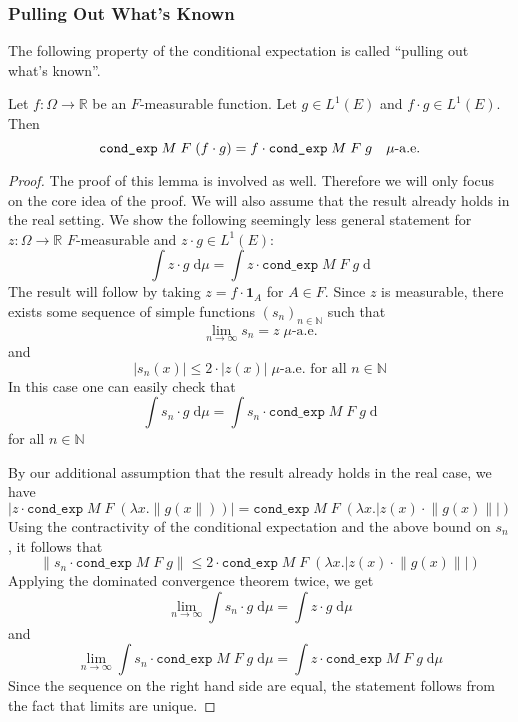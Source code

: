 \subsubsection{Pulling Out What's Known}

The following property of the conditional expectation is called ``pulling out what's known''. 

\begin{lemma}
	Let $f : \Omega \rightarrow \mathbb{R}$ be an $F$-measurable function. Let $g \in L^1(E)$ and $f \cdot g \in L^1(E)$. Then
	\[
		\normalfont \texttt{cond\_exp} \; M \; F \; (f \cdot g) = f \cdot \texttt{cond\_exp} \; M \; F \; g \quad \mu\textrm{-a.e.}
	\]
\end{lemma}
\begin{proof}
	The proof of this lemma is involved as well. Therefore we will only focus on the core idea of the proof. We will also assume that the result already holds in the real setting. We show the following seemingly less general statement for $z : \Omega \rightarrow \mathbb{R}$ $F$-measurable and $z \cdot g \in L^1(E)$:
	\[
		\int z \cdot g \; \textrm{d} \mu = \int z \cdot \texttt{cond\_exp} \; M \; F \; g \; \textrm{d}
	\]
	The result will follow by taking $z = f \cdot \mathbf{1}_A$ for $A \in F$.
	Since $z$ is measurable, there exists some sequence of simple functions $(s_n)_{n \in \mathbb{N}}$ such that
	\[
		\lim_{n \rightarrow \infty} s_n= z \; \mu\textrm{-a.e.}
	\]
	and
	\[
		\lvert s_n(x) \rvert \le 2 \cdot \lvert z(x) \rvert \; \mu\textrm{-a.e. for all } n \in \mathbb{N}
	\]
	In this case one can easily check that
	\[
		\int s_n \cdot g \; \textrm{d} \mu = \int s_n \cdot \texttt{cond\_exp} \; M \; F \; g \; \textrm{d}
	\]
	for all $n \in \mathbb{N}$
	
	By our additional assumption that the result already holds in the real case, we have
	\[
	\lvert z \cdot \texttt{cond\_exp} \; M \; F \; (\lambda x. \lVert g(x \rVert))\rvert = \texttt{cond\_exp} \; M \; F \; (\lambda x. \lvert z(x) \cdot \lVert g(x)\rVert\rvert)
	\]
	Using the contractivity of the conditional expectation and the above bound on $s_n$, it follows that 
	\[
		\lVert s_n \cdot \texttt{cond\_exp} \; M \; F \; g \rVert \le 2 \cdot \texttt{cond\_exp} \; M \; F \; (\lambda x. \lvert z(x) \cdot \lVert g(x)\rVert\rvert)
	\]
	Applying the dominated convergence theorem twice, we get
	\[
		\lim_{n \rightarrow \infty} \int s_n \cdot g \; \textrm{d} \mu = \int z \cdot g \; \textrm{d} \mu
	\]
	and
	\[
		\lim_{n \rightarrow \infty} \int s_n \cdot \texttt{cond\_exp} \; M \; F \; g \; \textrm{d} \mu = \int z \cdot \texttt{cond\_exp} \; M \; F \; g \; \textrm{d} \mu
	\]
	Since the sequence on the right hand side are equal, the statement follows from the fact that limits are unique.
\end{proof}

